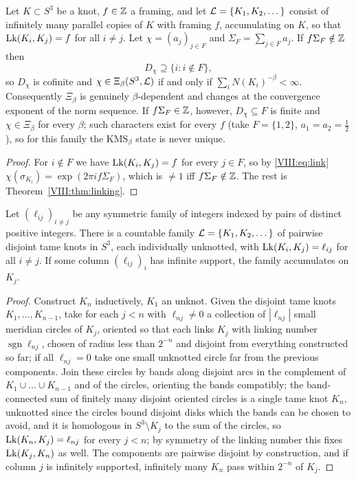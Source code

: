 \begin{theorem}\label{VIII:thm:infinite}
Let $K\subset S^3$ be a knot, $f\in\mathbb{Z}$ a framing, and let $\mathcal{L}=\{K_1,K_2,\dots\}$ consist of
infinitely many parallel copies of $K$ with framing $f$, accumulating on $K$, so that
$\operatorname{Lk}(K_i,K_j)=f$ for all $i\ne j$. Let $\chi=(a_j)_{j\in F}$ and $\Sigma_F=\sum_{j\in F}a_j$.
If $f\Sigma_F\notin\mathbb{Z}$ then
\[
D_\chi\supseteq\{i:i\notin F\},
\]
so $D_\chi$ is cofinite and $\chi\in\Xi_\beta(S^3,\mathcal{L})$ if and only if
$\sum_iN(K_i)^{-\beta}<\infty$. Consequently $\Xi_\beta$ is genuinely $\beta$-dependent and
changes at the convergence exponent of the norm sequence. If $f\Sigma_F\in\mathbb{Z}$, however,
$D_\chi\subseteq F$ is finite and $\chi\in\Xi_\beta$ for every $\beta$; such characters exist
for every $f$ (take $F=\{1,2\}$, $a_1=a_2=\tfrac12$), so for this family the
$\mathrm{KMS}_\beta$ state is never unique.
\end{theorem}

\begin{proof}
For $i\notin F$ we have $\operatorname{Lk}(K_i,K_j)=f$ for every $j\in F$, so by \eqref{VIII:eq:link}
$\chi(\sigma_{K_i})=\exp(2\pi if\Sigma_F)$, which is $\ne1$ iff $f\Sigma_F\notin\mathbb{Z}$. The rest
is Theorem~\ref{VIII:thm:linking}.
\end{proof}

\begin{lemma}\label{VIII:lem:realize}
Let $(\ell_{ij})_{i\ne j}$ be any symmetric family of integers indexed by pairs of distinct
positive integers. There is a countable family $\mathcal{L}=\{K_1,K_2,\dots\}$ of pairwise disjoint
tame knots in $S^3$, each individually unknotted, with $\operatorname{Lk}(K_i,K_j)=\ell_{ij}$ for all
$i\ne j$. If some column $(\ell_{ij})_i$ has infinite support, the family accumulates on
$K_j$.
\end{lemma}

\begin{proof}
Construct $K_n$ inductively, $K_1$ an unknot. Given the disjoint tame knots $K_1,\dots,K_{n-1}$,
take for each $j<n$ with $\ell_{nj}\ne0$ a collection of $|\ell_{nj}|$ small meridian circles
of $K_j$, oriented so that each links $K_j$ with linking number $\operatorname{sgn}\ell_{nj}$,
chosen of radius less than $2^{-n}$ and disjoint from everything constructed so far; if all
$\ell_{nj}=0$ take one small unknotted circle far from the previous components. Join these
circles by bands along disjoint arcs in the complement of $K_1\cup\dots\cup K_{n-1}$ and of the
circles, orienting the bands compatibly; the band-connected sum of finitely many disjoint
oriented circles is a single tame knot $K_n$, unknotted since the circles bound disjoint disks
which the bands can be chosen to avoid, and it is homologous in $S^3\setminus K_j$ to the sum
of the circles, so $\operatorname{Lk}(K_n,K_j)=\ell_{nj}$ for every $j<n$; by symmetry of the linking number
this fixes $\operatorname{Lk}(K_j,K_n)$ as well. The components are pairwise disjoint by construction, and
if column $j$ is infinitely supported, infinitely many $K_n$ pass within $2^{-n}$ of $K_j$.
\end{proof}

